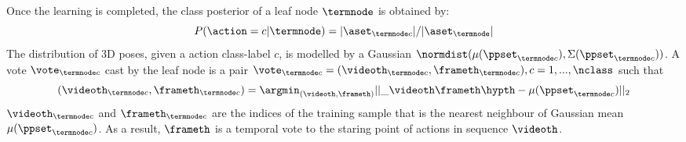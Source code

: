 

Once the learning is completed, the class posterior of a leaf node $\termnode$ is obtained by:  
\begin{equation}
	\label{eq:dforest_treeposterior}
	P(\action = c| \termnode) = |\aset_{\termnode c}|/| \aset_{\termnode}| 
\end{equation}
The distribution of 3D poses, given a action class-label $c$, is modelled by a Gaussian 
$\normdist(\mu({\ppset}_{\termnode c}), \Sigma(\ppset_{\termnode c}))$.
A vote $\vote_{\termnode c}$ cast by the leaf node is a  pair  
$ \vote_{\termnode c}= ( \videoth_{\termnode c}, \frameth_{\termnode c}), c = 1,...,\nclass$ such that
\begin{equation}
	(\videoth_{\termnode c}, \frameth_{\termnode c}) =  
	\displaystyle\argmin_{(\videoth, \frameth)} || \_{\videoth\frameth\hypth} - \mu({\ppset}_{\termnode c}) ||_{2}
\end{equation}
$\videoth_{\termnode c}$ and $\frameth_{\termnode c}$ are the indices of the training sample that is the nearest neighbour of Gaussian mean $\mu(\ppset_{\termnode c})$. As a result, $\frameth$ is a temporal vote to the staring point of actions in sequence $\videoth$.





